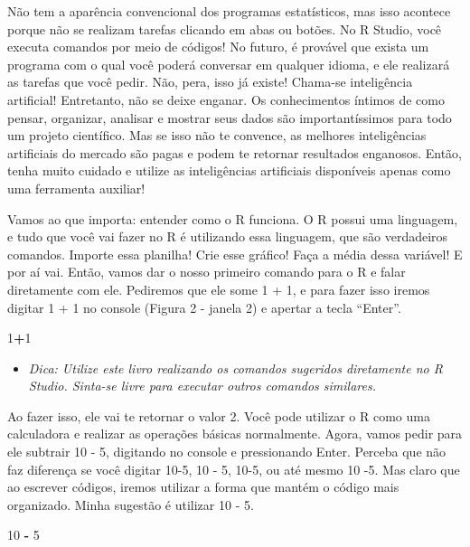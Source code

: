 \documentclass[
]{book}
\newenvironment{Shaded}{\begin{snugshade}}{\end{snugshade}}
\newcommand{\DecValTok}[1]{\textcolor[rgb]{0.00,0.00,0.81}{#1}}
\newcommand{\SpecialCharTok}[1]{\textcolor[rgb]{0.81,0.36,0.00}{\textbf{#1}}}
\providecommand{\tightlist}{%
  \setlength{\itemsep}{0pt}\setlength{\parskip}{0pt}}
\begin{document}
Não tem a aparência convencional dos programas estatísticos, mas isso acontece porque não se realizam tarefas clicando em abas ou botões. No R Studio, você executa comandos por meio de códigos! No futuro, é provável que exista um programa com o qual você poderá conversar em qualquer idioma, e ele realizará as tarefas que você pedir. Não, pera, isso já existe! Chama-se inteligência artificial! Entretanto, não se deixe enganar. Os conhecimentos íntimos de como pensar, organizar, analisar e mostrar seus dados são importantíssimos para todo um projeto científico. Mas se isso não te convence, as melhores inteligências artificiais do mercado são pagas e podem te retornar resultados enganosos. Então, tenha muito cuidado e utilize as inteligências artificiais disponíveis apenas como uma ferramenta auxiliar!

Vamos ao que importa: entender como o R funciona. O R possui uma linguagem, e tudo que você vai fazer no R é utilizando essa linguagem, que são verdadeiros comandos. Importe essa planilha! Crie esse gráfico! Faça a média dessa variável! E por aí vai. Então, vamos dar o nosso primeiro comando para o R e falar diretamente com ele. Pediremos que ele some 1 + 1, e para fazer isso iremos digitar 1 + 1 no console (Figura 2 - janela 2) e apertar a tecla ``Enter''.

\begin{Shaded}
\begin{Highlighting}[]
\DecValTok{1}\SpecialCharTok{+}\DecValTok{1}
\end{Highlighting}
\end{Shaded}

\begin{itemize}
\tightlist
\item
  \emph{Dica: Utilize este livro realizando os comandos sugeridos diretamente no R Studio. Sinta-se livre para executar outros comandos similares.}
\end{itemize}

Ao fazer isso, ele vai te retornar o valor 2. Você pode utilizar o R como uma calculadora e realizar as operações básicas normalmente. Agora, vamos pedir para ele subtrair 10 - 5, digitando no console e pressionando Enter. Perceba que não faz diferença se você digitar 10-5, 10 - 5, 10-5, ou até mesmo 10 -5. Mas claro que ao escrever códigos, iremos utilizar a forma que mantém o código mais organizado. Minha sugestão é utilizar 10 - 5.

\begin{Shaded}
\begin{Highlighting}[]
\DecValTok{10} \SpecialCharTok{{-}} \DecValTok{5}
\end{Highlighting}
\end{Shaded}
\end{document}
